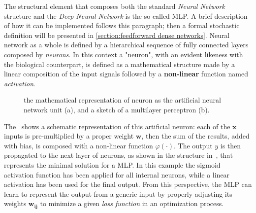 The structural element that composes both the standard \textit{Neural Network} structure and the \textit{Deep Neural Network} is the so called \acl{MLP}. A brief description of how it can be implemented follows this paragraph; then a formal stochastic definition will be presented in \cref{section:feedforward dense networks}. 
Neural network as a whole is defined by a hierarchical sequence of fully connected layers composed by \textit{neurons}. In this context a "neuron", with an evident likeness with the biological counterpart, is defined as a mathematical structure made by a linear composition of the input signals followed by a \textbf{non-linear} function named \textit{activation}.
\begin{figure}
    \centering
    \caption{the mathematical representation of neuron as the artificial neural network unit (a), and a sketch of a multilayer perceptron (b).}
    \label{fig:mlp}
\end{figure}
The~\Figure{\ref{fig:mlp_a}} shows a schematic representation of this artificial neuron: each of the $\bm{x}$ inputs is pre-multiplied by a proper weight $\bm{w}$, then the sum of the results, added with bias, is composed with a non-linear function $\varphi(\cdot)$. The output $y$ is then propagated to the next layer of neurons, as shown in the structure in~\Figure{\ref{fig:mlp_b}}, that represents the minimal solution for a \acs{MLP}. In this example the sigmoid activation function has been applied for all internal neurons, while a linear activation has been used for the final output.
From this perspective, the \acs{MLP} can learn to represent the output from a generic input by properly adjusting its weights $\bm{w_{ij}}$ to minimize a given \textit{loss function} in an optimization process.

